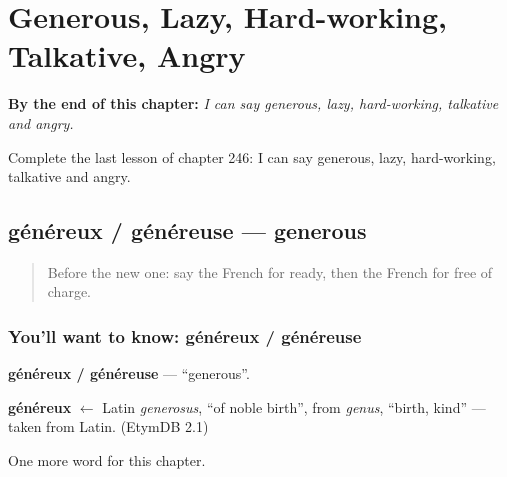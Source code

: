 
\chapter{Generous, Lazy, Hard-working, Talkative, Angry}
\label{ch:fr-generous-lazy-hard-working-talkative-angry}

\begin{chapteropening}
\textbf{By the end of this chapter:} \emph{I can say generous, lazy, hard-working, talkative and angry.}

Complete the last lesson of chapter 246: I can say generous, lazy, hard-working, talkative and angry.
\end{chapteropening}

\section[généreux / généreuse]{généreux / généreuse — generous}

\label{lesson:FR-C246-genereux-genereuse}



\begin{quote}
Before the new one: say the French for ready, then the French for free of charge.
\end{quote}

\subsection*{You'll want to know: généreux / généreuse}
\textbf{généreux / généreuse} — \textquotedblleft{}generous\textquotedblright{}.

\begin{cousinweb}
\textbf{généreux} $\leftarrow$ Latin \emph{generosus}, \textquotedblleft{}of noble birth\textquotedblright{}, from \emph{genus}, \textquotedblleft{}birth, kind\textquotedblright{} — taken from Latin. (EtymDB 2.1)
\end{cousinweb}

\begin{grammarlens}[title={What you've built}]
One more word for this chapter.
\end{grammarlens}

